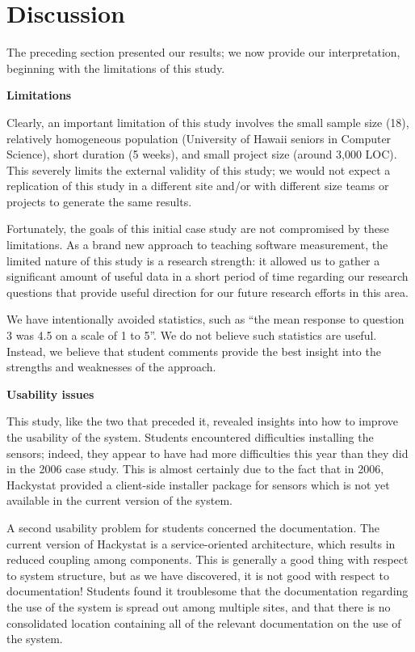 \documentclass{acm_proc_article-sp}
\begin{document}


\section{Discussion}
\label{sec:discussion}

The preceding section presented our results; we now provide our interpretation, beginning with the limitations of this study.

{\bf Limitations}

Clearly, an important limitation of this study involves the small sample size (18), relatively homogeneous population (University of Hawaii seniors in Computer Science), short duration (5 weeks), and small project size (around 3,000 LOC).  This severely limits the external validity of this study; we would not expect a replication of this study in a different site and/or with different size teams or projects to generate the same results. 

Fortunately, the goals of this initial case study are not compromised by these limitations.  As a brand new approach to teaching software measurement, the limited nature of this study is a research strength: it allowed us to gather a significant amount of useful data in a short period of time regarding our research questions that provide useful direction for our future research efforts in this area. 

We have intentionally avoided statistics, such as ``the mean response to question 3 was 4.5 on a scale of 1 to 5''.  We do not believe such statistics are useful.  Instead, we believe that student comments provide the best insight into the strengths and weaknesses of the approach.  

{\bf Usability issues}

This study, like the two that preceded it, revealed insights into how to
improve the usability of the system.  Students encountered difficulties
installing the sensors; indeed, they appear to have had more difficulties
this year than they did in the 2006 case study.  This is almost certainly
due to the fact that in 2006, Hackystat provided a client-side installer
package for sensors which is not yet available in the current version of
the system.

A second usability problem for students concerned the documentation.  The
current version of Hackystat is a service-oriented architecture, which
results in reduced coupling among components.  This is generally a good
thing with respect to system structure, but as we have discovered, it is
not good with respect to documentation!  Students found it troublesome that
the documentation regarding the use of the system is spread out among
multiple sites, and that there is no consolidated location containing all
of the relevant documentation on the use of the system.
\end{document}
